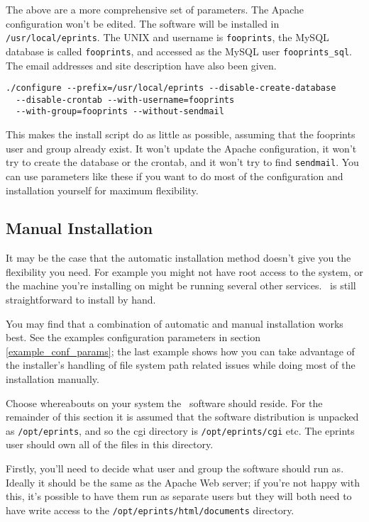The above are a more comprehensive set of parameters. The Apache configuration won't be edited. The software will be installed in {\tt /usr/local/eprints}. The UNIX and username is {\tt fooprints}, the MySQL database is called {\tt fooprints}, and accessed as the MySQL user {\tt fooprints\_sql}. The email addresses and site description have also been given.

\begin{verbatim}
./configure --prefix=/usr/local/eprints --disable-create-database
  --disable-crontab --with-username=fooprints
  --with-group=fooprints --without-sendmail
\end{verbatim}

This makes the install script do as little as possible, assuming that the fooprints user and group already exist. It won't update the Apache configuration, it won't try to create the database or the crontab, and it won't try to find {\tt sendmail}. You can use parameters like these if you want to do most of the configuration and installation yourself for maximum flexibility.


\subsection{Manual Installation}
\label{install_manual}

It may be the case that the automatic installation method doesn't give you the flexibility you need. For example you might not have root access to the system, or the machine you're installing on might be running several other services. \eprints\ is still straightforward to install by hand.

You may find that a combination of automatic and manual installation works best. See the examples configuration parameters in section \ref{example_conf_params}; the last example shows how you can take advantage of the installer's handling of file system path related issues while doing most of the installation manually.

Choose whereabouts on your system the \eprints\ software should reside. For the remainder of this section it is assumed that the software distribution is unpacked as {\tt /opt/eprints}, and so the cgi directory is {\tt /opt/eprints/cgi} etc. The eprints user should own all of the files in this directory.

Firstly, you'll need to decide what user and group the software should run as. Ideally it should be the same as the Apache Web server; if you're not happy with this, it's possible to have them run as separate users but they will both need to have write access to the {\tt /opt/eprints/html/documents} directory.

